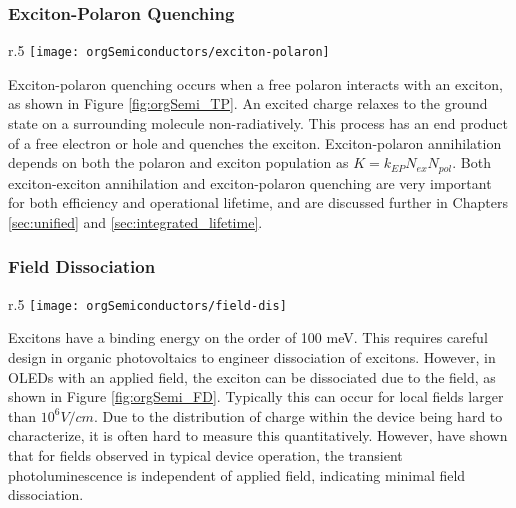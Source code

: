 \documentclass[../thesis.tex]{subfiles}
\begin{document}
\subsubsection{Exciton-Polaron Quenching}

\begin{wrapfigure}{r}{.5\textwidth}
\centering
\texttt{[image: orgSemiconductors/exciton-polaron]}
\caption{Exciton-polaron quenching process. A polaron non-radiatively couples with an exciton, leaving a loose polaron.}
\label{fig:orgSemi_TP}
\end{wrapfigure}

Exciton-polaron quenching occurs when a free polaron interacts with an exciton, as shown in Figure \ref{fig:orgSemi_TP}.  
An excited charge relaxes to the ground state on a surrounding molecule non-radiatively.
This process has an end product of a free electron or hole and quenches the exciton.
Exciton-polaron annihilation depends on both the polaron and exciton population as $K=k_{EP}N_{ex}N_{pol}$.
Both exciton-exciton annihilation and exciton-polaron quenching are very important for both efficiency and operational lifetime, and are discussed further in Chapters \ref{sec:unified} and \ref{sec:integrated_lifetime}.


\newpage
\subsubsection{Field Dissociation}
\begin{wrapfigure}{r}{.5\textwidth}
\centering
\texttt{[image: orgSemiconductors/field-dis]}
\caption{Field dissociation of an exciton.}
\label{fig:orgSemi_FD}
\end{wrapfigure}

Excitons have a binding energy on the order of 100 meV.\supercite{Turro1991a}
This requires careful design in organic photovoltaics to engineer dissociation of excitons.
However, in OLEDs with an applied field, the exciton can be dissociated due to the field, as shown in Figure \ref{fig:orgSemi_FD}.\supercite{Shaheen1998,Fujii1994,Stampor1997,Erickson2014}
Typically this can occur for local fields larger than $10^6 V/cm$.\supercite{Reineke2007}
Due to the distribution of charge within the device being hard to characterize, it is often hard to measure this quantitatively.
However, \textcite{Reineke2007} have shown that for fields observed in typical device operation, the transient photoluminescence is independent of applied field, indicating minimal field dissociation.
\end{document}
